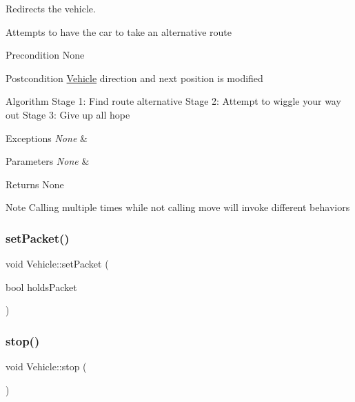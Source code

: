 Redirects the vehicle. 

Attempts to have the car to take an alternative route

\begin{DoxyPrecond}{Precondition}
None
\end{DoxyPrecond}
\begin{DoxyPostcond}{Postcondition}
\hyperlink{class_vehicle}{Vehicle} direction and next position is modified
\end{DoxyPostcond}
\begin{DoxyParagraph}{Algorithm}
Stage 1\+: Find route alternative Stage 2\+: Attempt to wiggle your way out Stage 3\+: Give up all hope
\end{DoxyParagraph}

\begin{DoxyExceptions}{Exceptions}
{\em None} & \\
\hline
\end{DoxyExceptions}

\begin{DoxyParams}{Parameters}
{\em None} & \\
\hline
\end{DoxyParams}
\begin{DoxyReturn}{Returns}
None
\end{DoxyReturn}
\begin{DoxyNote}{Note}
Calling multiple times while not calling move will invoke different behaviors 
\end{DoxyNote}
\hypertarget{class_vehicle_acd18d9e37e9d54c03cf0b6b6a95dfae1}{}\label{class_vehicle_acd18d9e37e9d54c03cf0b6b6a95dfae1} 
\subsubsection{\texorpdfstring{set\+Packet()}{setPacket()}}
{\footnotesize\ttfamily void Vehicle\+::set\+Packet (\begin{DoxyParamCaption}\item[{bool}]{holds\+Packet }\end{DoxyParamCaption})\hspace{0.3cm}{\ttfamily [inline]}}

\hypertarget{class_vehicle_a837e3c110672946892026ca6bfd21b27}{}\label{class_vehicle_a837e3c110672946892026ca6bfd21b27} 
\subsubsection{\texorpdfstring{stop()}{stop()}}
{\footnotesize\ttfamily void Vehicle\+::stop (\begin{DoxyParamCaption}{ }\end{DoxyParamCaption})\hspace{0.3cm}{\ttfamily [protected]}}



